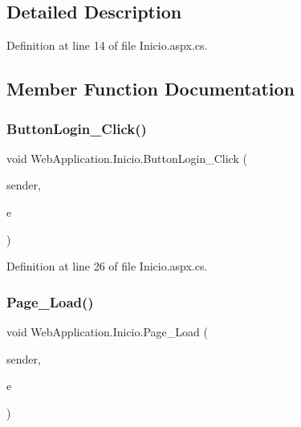 \subsection{Detailed Description}


Definition at line 14 of file Inicio.\+aspx.\+cs.



\subsection{Member Function Documentation}
\mbox{\label{classWebApplication_1_1Inicio_ae7a3d9491d82443eb3e3841c78221e54}} 
\subsubsection{\texorpdfstring{ButtonLogin\_Click()}{ButtonLogin\_Click()}}
{\footnotesize\ttfamily void Web\+Application.\+Inicio.\+Button\+Login\+\_\+\+Click (\begin{DoxyParamCaption}\item[{object}]{sender,  }\item[{Event\+Args}]{e }\end{DoxyParamCaption})\hspace{0.3cm}{\ttfamily [protected]}}



Definition at line 26 of file Inicio.\+aspx.\+cs.

\mbox{\label{classWebApplication_1_1Inicio_a49ed6b3fca4c9a9ab9487df6ac627716}} 
\subsubsection{\texorpdfstring{Page\_Load()}{Page\_Load()}}
{\footnotesize\ttfamily void Web\+Application.\+Inicio.\+Page\+\_\+\+Load (\begin{DoxyParamCaption}\item[{object}]{sender,  }\item[{Event\+Args}]{e }\end{DoxyParamCaption})\hspace{0.3cm}{\ttfamily [protected]}}



